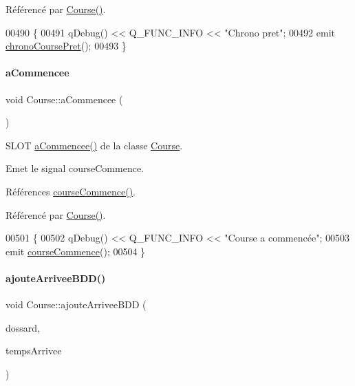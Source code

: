 Référencé par \hyperlink{class_course_af6317ecab95f8a2eb205b4f91b530992}{Course()}.


\begin{DoxyCode}
00490 \{
00491     qDebug() << Q\_FUNC\_INFO << \textcolor{stringliteral}{"Chrono pret"};
00492     emit \hyperlink{class_course_ab3f2a2c1bb8ed8a2550dc8fabc59e54e}{chronoCoursePret}();
00493 \}
\end{DoxyCode}
\mbox{\label{class_course_a8df970d7150703c3279903b09aa38855}} 
\paragraph{\texorpdfstring{a\+Commencee}{aCommencee}}
{\footnotesize\ttfamily void Course\+::a\+Commencee (\begin{DoxyParamCaption}{ }\end{DoxyParamCaption})\hspace{0.3cm}{\ttfamily [slot]}}



S\+L\+OT \hyperlink{class_course_a8df970d7150703c3279903b09aa38855}{a\+Commencee()} de la classe \hyperlink{class_course}{Course}. 

Emet le signal course\+Commence. 

Références \hyperlink{class_course_a2056f5c20f56e2c7eeea8195a55857bc}{course\+Commence()}.



Référencé par \hyperlink{class_course_af6317ecab95f8a2eb205b4f91b530992}{Course()}.


\begin{DoxyCode}
00501 \{
00502     qDebug() << Q\_FUNC\_INFO << \textcolor{stringliteral}{"Course a commencée"};
00503     emit \hyperlink{class_course_a2056f5c20f56e2c7eeea8195a55857bc}{courseCommence}();
00504 \}
\end{DoxyCode}
\mbox{\label{class_course_ac99042bf8b20e8d3a54e72c8a80f7ee7}} 
\paragraph{\texorpdfstring{ajoute\+Arrivee\+B\+D\+D()}{ajouteArriveeBDD()}}
{\footnotesize\ttfamily void Course\+::ajoute\+Arrivee\+B\+DD (\begin{DoxyParamCaption}\item[{Q\+String}]{dossard,  }\item[{Q\+String}]{temps\+Arrivee }\end{DoxyParamCaption})}



